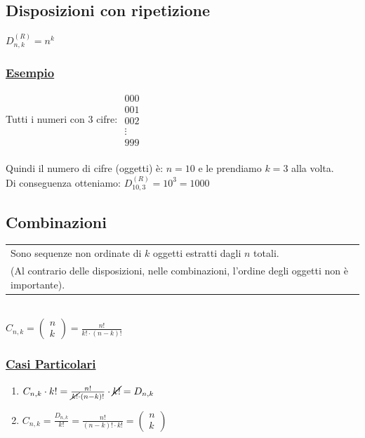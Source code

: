 \documentclass{article}
\begin{document}
\subsection{Disposizioni con ripetizione}
$D^{(R)}_{n,k} = n^k$ 
\subsubsection{\underline{Esempio}}
Tutti i numeri con 3 cifre: $\begin{matrix}

000 \\
001 \\
002 \\
\vdots \\
999

\end{matrix}$ \\
\\
Quindi il numero di cifre (oggetti) è: $n=10$ e le prendiamo $k=3$ alla volta. \\
Di conseguenza otteniamo: $D_{10,3}^{(R)} = 10^3 = 1000$

\subsection{Combinazioni}

\begin{tabular}{|p{14cm}}
Sono sequenze non ordinate di $k$ oggetti estratti dagli $n$ totali. \\
(Al contrario delle disposizioni, nelle combinazioni, l’ordine degli oggetti non è importante).
\end{tabular}
\\
$C_{n,k} = \left( \begin{matrix} n \\ k \end{matrix} \right) = \frac{n!}{k! \cdot (n-k)!}$
\subsubsection{\underline{Casi Particolari}}
\begin{enumerate}
    \item $C_{n,k} \cdot k! = \frac{n!}{\cancel{k!} \cdot (n-k)!} \cdot \cancel{k!} =D_{n,k}$
    \item $C_{n,k} = \frac{D_{n,k}}{k!} = \frac{n!}{(n-k)! \cdot k!} = \left( \begin{matrix} n \\ k \end{matrix} \right)$
\end{enumerate} 
\newpage
\end{document}
